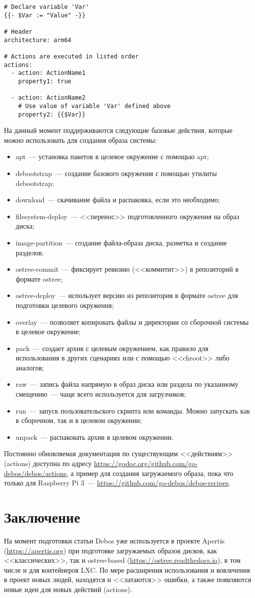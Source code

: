\documentclass[10pt, a5paper]{article}
\begin{document}
\begin{verbatim}
# Declare variable 'Var'
{{- $Var := "Value" -}}

# Header
architecture: arm64

# Actions are executed in listed order
actions:
  - action: ActionName1
    property1: true

  - action: ActionName2
    # Use value of variable 'Var' defined above
    property2: {{$Var}}
\end{verbatim}
На данный момент поддерживаются следующие базовые действия, которые можно использовать для создания образа системы:
\begin{itemize}
  \item apt~--- установка пакетов в целевое окружение с помощью apt;
  \item debootstrap~--- создание базового окружения с помощью утилиты debootstrap;
  \item download~--- скачивание файла и распаковка, если это необходимо;
  \item filesystem-deploy~--- <<перенос>> подготовленного окружения на образ диска;
  \item image-partition~--- создание файла-образа диска, разметка и создание разделов;
  \item ostree-commit~--- фиксирует ревизию (<<коммитит>>) в репозиторий в формате ostree;
  \item ostree-deploy~--- использует версию из репозитория в формате ostree для подготовки целевого окружения;
  \item overlay~--- позволяет копировать файлы и директории со сборочной системы в целевое окружение;
  \item pack~--- создает архив с целевым окружением, как правило для использования в других сценариях или с помощью <<chroot>> либо аналогов;
  \item raw~--- запись файла напрямую в образ диска или раздела по указанному смещению~--- чаще всего используется для загрузчиков;
  \item run~--- запуск пользовательского скрипта или команды. Можно запускать как в сборочном, так и в целевом окружении;
  \item unpack~--- распаковать архив в целевом окружении.
\end{itemize}
Постоянно обновляемая документация по существующим <<действиям>> (actions) доступна по адресу \url{https://godoc.org/github.com/go-debos/debos/actions}, а пример для создания загружаемого образа, пока что только для Raspberry Pi 3~--- \url{https://github.com/go-debos/debos-recipes}.

\section*{Заключение}

На момент подготовки статьи Debos уже используется в проекте Apertis (\url{https://apertis.org}) при подготовке загружаемых образов дисков, как <<классических>>, так и ostree-based (\url{https://ostree.readthedocs.io}), в том числе и для контейнеров LXC. По мере расширения использования и вовлечения в проект новых людей, находятся и <<латаются>> ошибки, а также появляются новые идеи для новых действий (actions).
\end{document}
